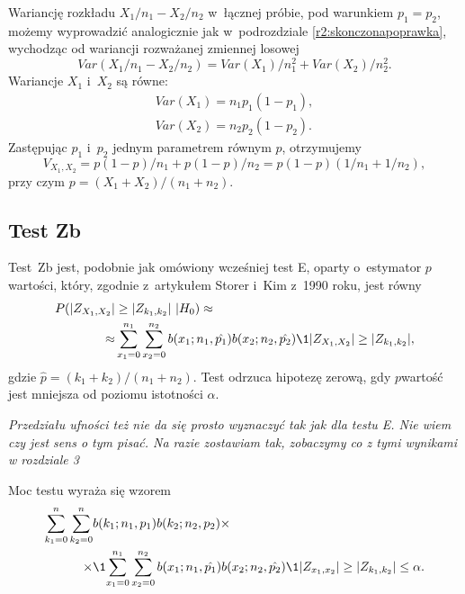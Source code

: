 Wariancję rozkładu $X_1/n_1-X_2/n_2$ w~łącznej próbie, pod warunkiem $p_1=p_2$, możemy wyprowadzić analogicznie jak w~podrozdziale \ref{r2:skonczonapoprawka}, wychodząc od wariancji rozważanej zmiennej losowej
\begin{equation}
Var(X_1/n_1-X_2/n_2) = Var(X_1)/n_1^2+Var(X_2)/n_2^2.
\end{equation}
Wariancje $X_1$ i~$X_2$ są równe:
\begin{align}
Var(X_1)=n_1 p_1 (1-p_1),\\
Var(X_2)=n_2 p_2 (1-p_2).
\end{align}
Zastępując $p_1$ i~$p_2$ jednym parametrem równym $p$, otrzymujemy
\begin{equation}
V_{X_1,X_2} = p(1-p)/n_1 + p(1-p)/n_2 = p(1-p)(1/n_1+1/n_2),
\end{equation}
przy czym $p=(X_1+X_2)/(n_1+n_2)$.

\subsection{Test Zb}

Test~Zb jest, podobnie jak omówiony wcześniej test E, oparty o~estymator $p$\dywiz wartości, który, zgodnie z~artykułem Storer i~Kim z~1990 roku, jest równy~\cite{Storer1990}
\begin{equation}
\begin{split}
P(|Z_{X_1,X_2}|&\geq|Z_{k_1,k_2}|\ |H_0) \approx \\
\approx & \sum_{x_1=0}^{n_1}\sum_{x_2=0}^{n_2} b(x_1;n_1,\hat{p_1})b(x_2;n_2,\hat{p_2})\1{|Z_{X_1,X_2}|\geq|Z_{k_1,k_2}|},
\end{split}
\end{equation}
gdzie $\hat{p}=(k_1+k_2)/(n_1+n_2)$.
Test odrzuca hipotezę zerową, gdy $p$\dywiz wartość jest mniejsza od poziomu istotności $\alpha$.

\textit{Przedziału ufności też nie da się prosto wyznaczyć tak jak dla testu E. Nie wiem czy jest sens o tym pisać. Na razie zostawiam tak, zobaczymy co z tymi wynikami w rozdziale 3}

Moc testu wyraża się wzorem
\begin{equation}
\begin{split}
\sum_{k_1=0}^{n}\sum_{k_2=0}^{n}& b(k_1;n_1,p_1)b(k_2;n_2,p_2) \times \\
\times &\1{\sum_{x_1=0}^{n_1} \sum_{x_2=0}^{n_2} b(x_1;n_1,\hat{p_1}) b(x_2;n_2,\hat{p_2}) \1{|Z_{x_1,x_2}|\geq|Z_{k_1,k_2}|} \leq\alpha}.
\end{split}
\end{equation}

